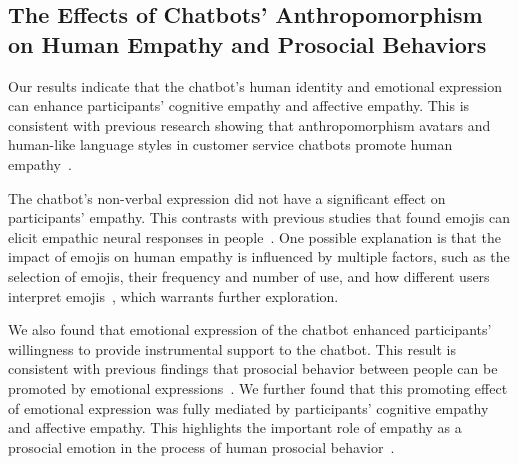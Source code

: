 \subsection{The Effects of Chatbots' Anthropomorphism on Human Empathy and Prosocial Behaviors}

Our results indicate that the chatbot's human identity and emotional expression can enhance participants' cognitive empathy and affective empathy. 
This is consistent with previous research showing that anthropomorphism avatars and human-like language styles in customer service chatbots promote human empathy~\cite{janson2023leverage}. 

The chatbot's non-verbal expression did not have a significant effect on participants' empathy. This contrasts with previous studies that found emojis can elicit empathic neural responses in people~\cite{liao2021emoji}. One possible explanation is that the impact of emojis on human empathy is influenced by multiple factors, such as the selection of emojis, their frequency and number of use, and how different users interpret emojis~\cite{jeon2022differences, volkel2019understanding}, which warrants further exploration.


We also found that emotional expression of the chatbot enhanced participants' willingness to provide instrumental support to the chatbot. This result is consistent with previous findings that prosocial behavior between people can be promoted by emotional expressions~\cite{van2015emotional}. We further found that this promoting effect of emotional expression was fully mediated by participants' cognitive empathy and affective empathy. This highlights the important role of empathy as a prosocial emotion in the process of human prosocial behavior~\cite{hoffman2008empathy, Eisenberg1987}. 

